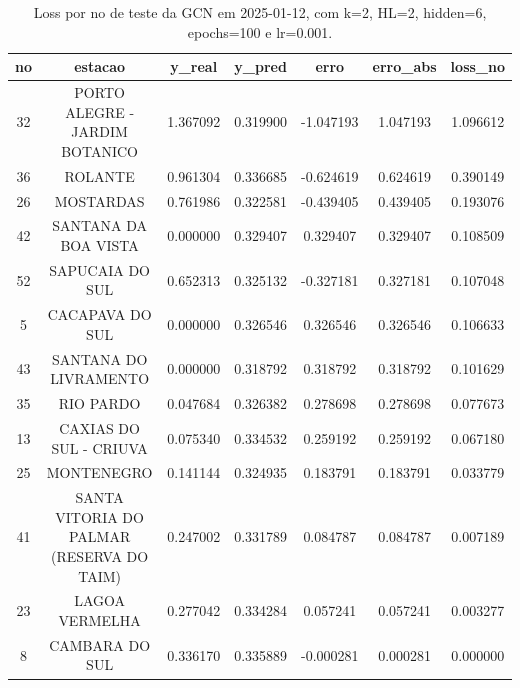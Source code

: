 \begin{table}[h]
\centering
\caption{Loss por no de teste da GCN em 2025-01-12, com k=2, HL=2, hidden=6, epochs=100 e lr=0.001.}
\label{tab:gcn_loss_k2_hl2_h6_e100_d20250112}
\begin{tabular}{ccccccc}
\toprule
no & estacao & y\_real & y\_pred & erro & erro\_abs & loss\_no \\
\midrule
32 & PORTO ALEGRE - JARDIM BOTANICO & 1.367092 & 0.319900 & -1.047193 & 1.047193 & 1.096612 \\
36 & ROLANTE & 0.961304 & 0.336685 & -0.624619 & 0.624619 & 0.390149 \\
26 & MOSTARDAS & 0.761986 & 0.322581 & -0.439405 & 0.439405 & 0.193076 \\
42 & SANTANA DA BOA VISTA & 0.000000 & 0.329407 & 0.329407 & 0.329407 & 0.108509 \\
52 & SAPUCAIA DO SUL & 0.652313 & 0.325132 & -0.327181 & 0.327181 & 0.107048 \\
5 & CACAPAVA DO SUL & 0.000000 & 0.326546 & 0.326546 & 0.326546 & 0.106633 \\
43 & SANTANA DO LIVRAMENTO & 0.000000 & 0.318792 & 0.318792 & 0.318792 & 0.101629 \\
35 & RIO PARDO & 0.047684 & 0.326382 & 0.278698 & 0.278698 & 0.077673 \\
13 & CAXIAS DO SUL - CRIUVA & 0.075340 & 0.334532 & 0.259192 & 0.259192 & 0.067180 \\
25 & MONTENEGRO & 0.141144 & 0.324935 & 0.183791 & 0.183791 & 0.033779 \\
41 & SANTA VITORIA DO PALMAR (RESERVA DO TAIM) & 0.247002 & 0.331789 & 0.084787 & 0.084787 & 0.007189 \\
23 & LAGOA VERMELHA & 0.277042 & 0.334284 & 0.057241 & 0.057241 & 0.003277 \\
8 & CAMBARA DO SUL & 0.336170 & 0.335889 & -0.000281 & 0.000281 & 0.000000 \\
\bottomrule
\end{tabular}
\end{table}
